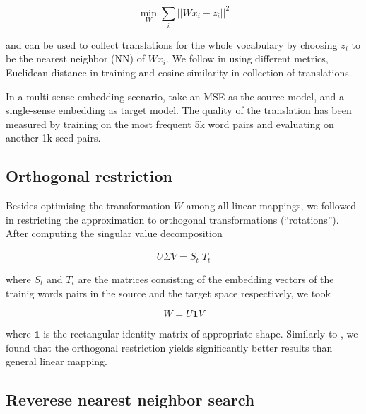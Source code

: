 \documentclass[11pt]{article}
\begin{document}
\[\min_W \sum_i || Wx_i - z_i ||^2 \]

\noindent and can be used to collect translations for the whole vocabulary by
choosing $z_i$ to be the nearest neighbor (NN) of $Wx_i$.
We follow \cite{Mikolov:2013x} in using different metrics, Euclidean
 distance in training and cosine similarity in collection of translations.


In a multi-sense embedding scenario, \cite{Borbely:2016} take an MSE as the
source model, and a single-sense embedding as target model.  The quality of the
translation has been measured by training on the most frequent 5k word pairs
and evaluating on another 1k seed pairs.

\subsection{Orthogonal restriction}

Besides optimising the transformation $W$ among all linear mappings, we
followed \cite{Xing:2015} in restricting the approximation to orthogonal
transformations (``rotations''). After computing the singular value
decomposition

\[U\Sigma V=S_t^\top T_t\]

\noindent where $S_t$ and $T_t$ are the matrices consisting of the embedding vectors of
the trainig words pairs in the source and the target space respectively, we
took

\[W=U\mathbf{1}V\]

\noindent where $\mathbf 1$ is the rectangular identity matrix of appropriate shape.
Similarly to \cite{Xing:2015}, we found that the orthogonal restriction yields
significantly better results than general linear mapping.

\subsection{Reverese nearest neighbor search}



\end{document}
